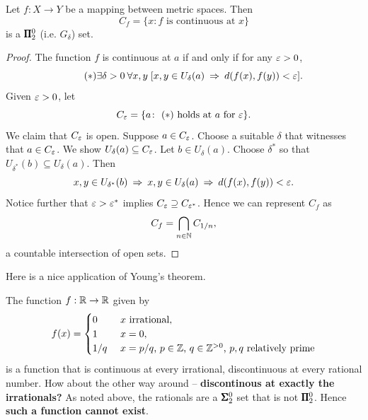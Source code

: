 \begin{theorem}[Young]\label{thm-young}Let $f: X \to Y$ be a mapping between metric spaces. Then
\begin{equation*}
C_f = \{ x \colon f \text{ is continuous at $x$} \}
\end{equation*}
is a $\pmb{\Pi}^0_2$ (i.e. $G_\delta$) set.

\end{theorem}\begin{proof}The function $f$ is continuous at $a$ if and only if for any $\varepsilon > 0$,
\begin{equation*}
\tag{$*$}
        \exists \delta > 0 \: \forall x,y \; [ x,y \in U_\delta(a) \: \Rightarrow \: d(f(x),f(y)) < \varepsilon  ].
\end{equation*}
Given $\varepsilon > 0$, let
\begin{equation*}
C_\varepsilon = \{ a \colon \text{ ($*$) holds at $a$ for $\varepsilon$} \}.
\end{equation*}
We claim that $C_\varepsilon$ is open. Suppose $a \in C_\varepsilon$. Choose a suitable $\delta$ that witnesses that $a \in C_\varepsilon$. We show $U_\delta(a) \subseteq C_\varepsilon$. Let $b \in U_\delta(a)$. Choose $\delta^*$ so that $U_{\delta^*}(b) \subseteq U_\delta(a)$. Then
\begin{equation*}
x,y \in U_{\delta^*}(b) \: \Rightarrow \: x,y \in U_\delta(a) \: \Rightarrow \: d(f(x),f(y)) < \varepsilon.
\end{equation*}
Notice further that $\varepsilon > \varepsilon^*$ implies $C_\varepsilon \supseteq C_{\varepsilon^*}$. Hence we can represent $C_f$ as
\begin{equation*}
C_f = \bigcap_{n \in\mathbb{N}} C_{1/n},
\end{equation*}
a countable intersection of open sets.

\end{proof}Here is a nice application of Young's theorem.

The function $f: \mathbb{R} \to \mathbb{R}$ given by
\begin{equation*}
f(x) = \begin{cases}
		0 & \text{ $x$ irrational}, \\
		1 & \text{ $x = 0$}, \\
		1/q & \text{ $x = p/q$, $p\in \mathbb{Z}$, $q \in \mathbb{Z}^{>0} $, $p,q$ relatively prime} 
	\end{cases}
\end{equation*}
is a function that is continuous at every irrational, discontinuous at every rational number. How about the other way around -- \textbf{discontinous at exactly the irrationals?} As noted above, the rationals are a $\pmb{\Sigma}^0_2$ set that is not $\pmb{\Pi}^0_2$. Hence \textbf{such a function cannot exist}.

